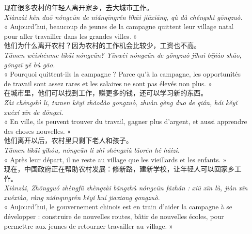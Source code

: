 \documentclass[11pt]{article}
\begin{document}
\begin{textebox}
现在很多农村的年轻人离开家乡，去大城市工作。\\
\emph{Xiànzài hěn duō nóngcūn de niánqīngrén líkāi jiāxiāng, qù dà chéngshì gōngzuò.}\\
« Aujourd'hui, beaucoup de jeunes de la campagne quittent leur village natal pour aller travailler dans les grandes villes. »\\[4pt]
他们为什么离开农村？因为农村的工作机会比较少，工资也不高。\\
\emph{Tāmen wèishénme líkāi nóngcūn? Yīnwèi nóngcūn de gōngzuò jīhuì bǐjiào shǎo, gōngzī yě bù gāo.}\\
« Pourquoi quittent-ils la campagne ? Parce qu'à la campagne, les opportunités de travail sont assez rares et les salaires ne sont pas élevés non plus. »\\[4pt]
在城市里，他们可以找到工作，赚更多的钱，还可以学习新的东西。\\
\emph{Zài chéngshì li, tāmen kěyǐ zhǎodào gōngzuò, zhuàn gèng duō de qián, hái kěyǐ xuéxí xīn de dōngxi.}\\
« En ville, ils peuvent trouver du travail, gagner plus d'argent, et aussi apprendre des choses nouvelles. »\\[4pt]
他们离开以后，农村里只剩下老人和孩子。\\
\emph{Tāmen líkāi yǐhòu, nóngcūn li zhǐ shèngxià lǎorén hé háizi.}\\
« Après leur départ, il ne reste au village que les vieillards et les enfants. »\\[4pt]
现在，中国政府正在帮助农村发展：修新路，建新学校，让年轻人可以回家乡工作。\\
\emph{Xiànzài, Zhōngguó zhèngfǔ zhèngzài bāngzhù nóngcūn fāzhǎn : xiū xīn lù, jiàn xīn xuéxiào, ràng niánqīngrén kěyǐ huí jiāxiāng gōngzuò.}\\
« Aujourd'hui, le gouvernement chinois est en train d'aider la campagne à se développer : construire de nouvelles routes, bâtir de nouvelles écoles, pour permettre aux jeunes de retourner travailler au village. »
\end{textebox}
\end{document}
